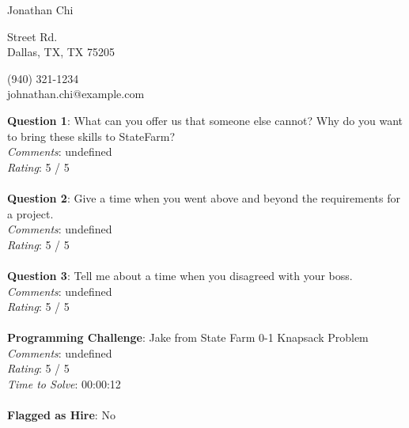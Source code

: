 \documentclass[12pt]{article}
\begin{document}
{\LARGE \begin{center}Jonathan Chi\end{center}}

\begin{multicols}{2}
 Street Rd. \\
Dallas, TX, TX 75205
\columnbreak

\noindent
(940) 321-1234 \\
johnathan.chi@example.com
\end{multicols}

\noindent
\textbf{Question 1}: What can you offer us that someone else cannot? Why do you want to bring these skills to StateFarm?
\\\noindent
\textit{Comments}: undefined
\\\noindent
\textit{Rating}: 5 / 5
\\\\
\noindent
\textbf{Question 2}: Give a time when you went above and beyond the requirements for a project.
\\\noindent
\textit{Comments}: undefined
\\\noindent
\textit{Rating}: 5 / 5
\\\\
\noindent
\textbf{Question 3}: Tell me about a time when you disagreed with your boss.
\\\noindent
\textit{Comments}: undefined
\\\noindent
\textit{Rating}: 5 / 5
\\\\
\noindent
\textbf{Programming Challenge}: Jake from State Farm 0-1 Knapsack Problem
\\\noindent
\textit{Comments}: undefined
\\\noindent
\textit{Rating}: 5 / 5
\\\noindent
\textit{Time to Solve}: 00:00:12
\\\\
\textbf{Flagged as Hire}: No
\\\\ 
\end{document}

